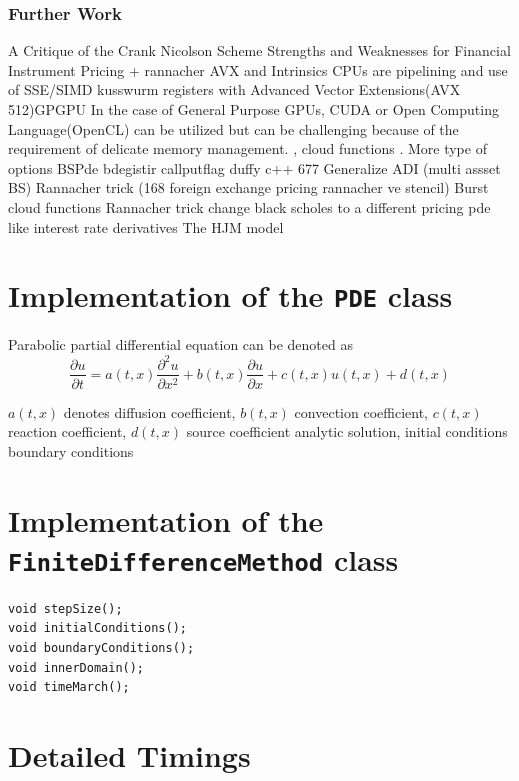 \documentclass[12pt, oneside]{book}
\theoremstyle{plain}
\theoremstyle{definition}
\begin{document}
\subsection{Further Work}
A Critique of the Crank Nicolson Scheme Strengths and Weaknesses for Financial Instrument Pricing + rannacher 
AVX and Intrinsics CPUs are pipelining and use of SSE/SIMD kusswurm registers with Advanced Vector Extensions(AVX 512)GPGPU In the case of General Purpose GPUs, CUDA or Open Computing Language(OpenCL) can be utilized but can be challenging because of the requirement of delicate memory management. \cite{fpga},  cloud functions \cite{cloudfunc}.
More type of options BSPde bdegistir callputflag duffy c++ 677 
Generalize ADI (multi assset BS)
Rannacher trick (168 foreign exchange pricing rannacher ve stencil)
Burst cloud functions
Rannacher trick
change black scholes to a different pricing pde like interest rate derivatives The HJM model \cite{kohl}


\appendix

\chapter{Implementation of the {\tt PDE} class}
Parabolic partial differential equation can be denoted as
$$ \frac{\partial u}{\partial t} = a(t,x) \frac{\partial^2 u}{\partial x^2} + b(t,x) \frac{\partial u}{\partial x} + c(t,x) u(t,x) + d(t,x) $$

$a(t,x)$ denotes diffusion coefficient,  $b(t,x)$ convection coefficient, $c(t,x)$ reaction coefficient, $d(t,x)$ source coefficient
analytic solution, initial conditions boundary conditions
\chapter{Implementation of the {\tt FiniteDifferenceMethod} class}

\begin{verbatim}
void stepSize();
void initialConditions();
void boundaryConditions();
void innerDomain();
void timeMarch();
\end{verbatim}

\chapter{Detailed Timings} \label{timings}
\end{document}
